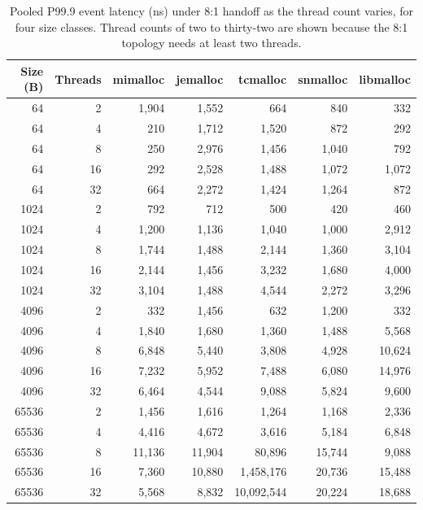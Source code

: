 \begin{table}[!htbp]
\centering
\footnotesize
\setlength{\tabcolsep}{3pt}
\caption{Pooled P99.9 event latency (ns) under 8:1 handoff as the thread count varies, for four size classes. Thread counts of two to thirty-two are shown because the 8:1 topology needs at least two threads.}
\label{tab:scaling-p999}
\begin{tabular}{rrrrrrr}
\toprule
Size (B) & Threads & mimalloc & jemalloc & tcmalloc & snmalloc & libmalloc \\
\midrule
64 & 2 & 1{,}904 & 1{,}552 & 664 & 840 & 332 \\
64 & 4 & 210 & 1{,}712 & 1{,}520 & 872 & 292 \\
64 & 8 & 250 & 2{,}976 & 1{,}456 & 1{,}040 & 792 \\
64 & 16 & 292 & 2{,}528 & 1{,}488 & 1{,}072 & 1{,}072 \\
64 & 32 & 664 & 2{,}272 & 1{,}424 & 1{,}264 & 872 \\
1024 & 2 & 792 & 712 & 500 & 420 & 460 \\
1024 & 4 & 1{,}200 & 1{,}136 & 1{,}040 & 1{,}000 & 2{,}912 \\
1024 & 8 & 1{,}744 & 1{,}488 & 2{,}144 & 1{,}360 & 3{,}104 \\
1024 & 16 & 2{,}144 & 1{,}456 & 3{,}232 & 1{,}680 & 4{,}000 \\
1024 & 32 & 3{,}104 & 1{,}488 & 4{,}544 & 2{,}272 & 3{,}296 \\
4096 & 2 & 332 & 1{,}456 & 632 & 1{,}200 & 332 \\
4096 & 4 & 1{,}840 & 1{,}680 & 1{,}360 & 1{,}488 & 5{,}568 \\
4096 & 8 & 6{,}848 & 5{,}440 & 3{,}808 & 4{,}928 & 10{,}624 \\
4096 & 16 & 7{,}232 & 5{,}952 & 7{,}488 & 6{,}080 & 14{,}976 \\
4096 & 32 & 6{,}464 & 4{,}544 & 9{,}088 & 5{,}824 & 9{,}600 \\
65536 & 2 & 1{,}456 & 1{,}616 & 1{,}264 & 1{,}168 & 2{,}336 \\
65536 & 4 & 4{,}416 & 4{,}672 & 3{,}616 & 5{,}184 & 6{,}848 \\
65536 & 8 & 11{,}136 & 11{,}904 & 80{,}896 & 15{,}744 & 9{,}088 \\
65536 & 16 & 7{,}360 & 10{,}880 & 1{,}458{,}176 & 20{,}736 & 15{,}488 \\
65536 & 32 & 5{,}568 & 8{,}832 & 10{,}092{,}544 & 20{,}224 & 18{,}688 \\
\bottomrule
\end{tabular}
\end{table}
